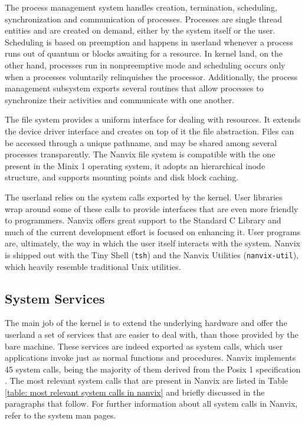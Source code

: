 		The process management system handles creation, termination,
		scheduling, synchronization and communication of processes.
		Processes are single thread entities and are created on demand,
		either by the system itself or the user. Scheduling is based on
		preemption and happens in userland whenever a process runs out
		of quantum or blocks awaiting for a resource. In kernel land, on
		the other hand, processes run in nonpreemptive mode and
		scheduling occurs only when a processes voluntarily relinquishes
		the processor.  Additionally, the process management subsystem
		exports several routines that allow processes to synchronize
		their activities and communicate with one another.

		The file system provides a uniform interface for dealing with
		resources. It extends the device driver interface and creates on
		top of it the file abstraction. Files can be accessed through a
		unique pathname, and may be shared among several processes
		transparently.  The Nanvix file system is compatible with the
		one present in the Minix 1 operating system, it adopts an
		hierarchical inode structure, and supports mounting points and
		disk block caching.

		The userland relies on the system calls exported by the kernel.
		User libraries wrap around some of these calls to provide
		interfaces that are even more friendly to programmers. Nanvix
		offers great support to the Standard C Library and much of the
		current development effort is focused on enhancing it. User
		programs are, ultimately, the way in which the user itself
		interacts with the system. Nanvix is shipped out with the Tiny
		Shell (\texttt{tsh}) and the Nanvix Utilities
		(\texttt{nanvix-util}), which heavily resemble traditional Unix
		utilities. 

	\subsection{System Services}
	\label{section: system services}

		The main job of the kernel is to extend the underlying hardware and
		offer the userland a set of services that are easier to deal with,
		than those provided by the bare machine. These services are indeed
		exported as system calls, which user applications invoke just as
		normal functions and procedures. Nanvix implements 45 system calls,
		being the majority of them derived from the Posix 1 specification
		\cite{IEEE:08}. The most relevant system calls that are present in
		Nanvix are listed in Table \ref{table: most relevant system calls in
		nanvix} and briefly discussed in the paragraphs that follow. For
		further information about all system calls in Nanvix, refer to the
		system man pages.

